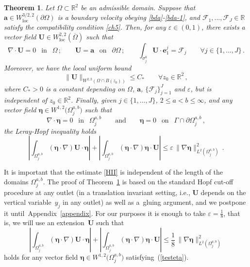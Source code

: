 \documentclass[11pt]{article}
\newtheorem{theorem}{Theorem}[section]
\numberwithin{equation}{section}
\numberwithin{figure}{section}
\newcommand{\R}{\mathbb{R}}
\def\loc{{\mathrm{loc}}}
\def\R{{\mathbb R}}
\def\Fe{{\mathcal F}}
\def\bbe{{\boldsymbol{\eta}}}
\def\ee{{\mathbf e}}
\def\ae{{\mathbf a}}
\def\e{{\varepsilon}}
\begin{document}
\begin{theorem}\label{fluxcarrier}
Let $\Omega \subset \mathbb{R}^2$ be an admissible domain. Suppose that $\ae\in W^{3/2,2}_\loc(\partial\Omega)$ is a boundary velocity obeying
\eqref{bda}-\eqref{bda-1}, and $\Fe_1,...,\Fe_J \in \mathbb{R}$ satisfy the compatibility condition \eqref{ch5}. Then, for any $\e \in (0,1)$,
there exists a vector field $\mathbf{U} \in W^{2,2}_{\loc}(\overline\Omega)$ such that
\begin{equation} \label{vecpsi}
 \nabla \cdot \mathbf{U} =0 \ \ \mbox{ in } \ \ \Omega \, ; \qquad \mathbf{U} = \mathbf{a} \ \ \mbox{ on } \ \ \partial \Omega \, ; \qquad \int_{\sigma_j^0} \mathbf{U} \cdot \ee_1^j = \Fe_j \qquad \forall j \in \{1,\dots,J \} \, .
\end{equation}
Moreover, we have the local uniform bound
\begin{equation}  \label{uboundz2}
	\| \mathbf{U} \|_{W^{2,2}(\Omega\cap B(z_0))}  \le C_* \qquad \forall z_0\in\R^2\, ,
\end{equation}
where $C_* > 0$ is a constant depending on $\Omega$, $\ae$, $\{\mathcal{F}_j\}^{J}_{j=1}$ and $\varepsilon$, but is independent of $z_0 \in\R^2$.
Finally, given $j \in \{1,\dots, J\}$, $2\le a<b\le\infty$, and any vector field $\bbe \in W^{1,2}\bigl( \Omega_j^{a,b}\bigr)$ such that
  \begin{equation}\label{testeta}
\nabla \cdot \bbe =0 \ \ \mbox{ in } \ \ \Omega_j^{a,b} \qquad \text{and} \qquad  \bbe = 0 \ \ \mbox{ on } \ \ \Gamma \cap \partial  \Omega_j^{a,b} \, ,
\end{equation}
the Leray-Hopf inequality holds
\begin{equation}\label{HII}
\left| \int_{  \Omega_j^{a,b}} (\bbe\cdot \nabla)\mathbf{U} \cdot \bbe \right| +
\left| \int_{ \Omega_j^{a,b}} (\bbe\cdot \nabla)\bbe\cdot\mathbf{U} \right| \leq \varepsilon \,
\| \nabla\bbe \|_{L^{2}(  \Omega_j^{a,b})}^2 \, .
\end{equation}
\end{theorem}
It is important that the estimate \eqref{HII} is independent of the length of the domains $\Omega_j^{a,b}$. The proof of Theorem~\ref{fluxcarrier} is based on the standard Hopf cut-off procedure at any outlet (in a translation invariant setting, i.e., $\mathbf{U}$ depends on the vertical variable~$y_j$ in any outlet) as well as a~gluing argument, and we postpone it until~Appendix~\ref{appendix}. For our purposes it is enough to take $\e=\frac18$, that is, we will use an extension~$\mathbf{U}$ such that 
\begin{equation}\label{HI}
\left| \int_{  \Omega_j^{a,b}} (\bbe\cdot \nabla)\mathbf{U} \cdot \bbe \right| +
\left| \int_{ \Omega_j^{a,b}} (\bbe\cdot \nabla)\bbe\cdot\mathbf{U} \right| \leq \frac18 \,
\| \nabla\bbe \|_{L^{2}(  \Omega_j^{a,b})}^2 
\end{equation}
holds for any vector field $\bbe \in W^{1,2}\bigl( \Omega_j^{a,b}\bigr)$ satisfying~(\ref{testeta}). 
\end{document}
